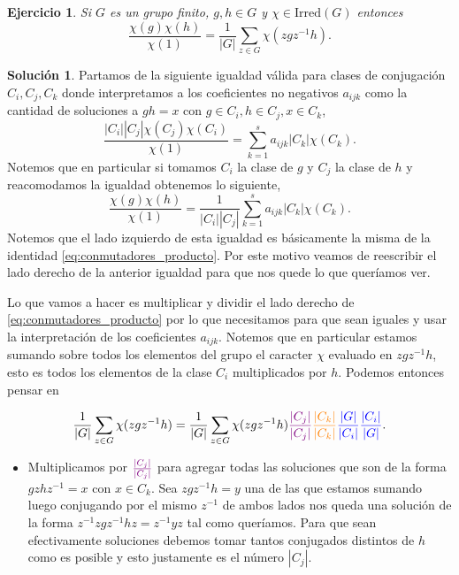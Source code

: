 \documentclass[11pt]{article}
\theoremstyle{plain}
\newtheorem*{ej}{Ejercicio}
\theoremstyle{definition}
\newtheorem*{sol}{Solución}
\theoremstyle{remark}
\begin{document}
	

\begin{tcolorbox}[colback=teal!25!white,colframe=teal!75!black]
	\begin{ej}
		Si $G$ es un grupo finito, $g,h \in G$ y $\chi \in \text{Irred}(G)$ entonces
		\begin{equation}
		\label{eq:conmutadores_producto}
		\dfrac{\chi(g) \chi(h)}{\chi (1)} = \dfrac{1}{|G|} \sum_{z \in G} \chi(zgz^{-1}h).
		\end{equation}
		 
	\end{ej}	
\end{tcolorbox}
\medskip

\begin{sol}
	Partamos de la siguiente igualdad válida para clases de conjugación $C_i, C_j, C_k$ donde interpretamos a los coeficientes no negativos $a_{ijk}$ como la cantidad de soluciones a $gh=x$ con $g \in C_i, h \in C_j, x \in C_k$,
	\[ 
	\dfrac{|C_i||C_j|\chi(C_j)\chi(C_i)}{\chi(1)} = \sum_{k=1}^s a_{ijk} |C_k| \chi(C_k).
	\]
	Notemos que en particular si tomamos $C_i$ la clase de $g$ y $C_j$ la clase de $h$ y reacomodamos la igualdad obtenemos lo siguiente,
	\[ 
	\dfrac{\chi(g)\chi(h)}{\chi(1)} = \dfrac{1}{|C_i||C_j|} \sum_{k=1}^s a_{ijk} |C_k| \chi(C_k).
	\]
	Notemos que el lado izquierdo de esta igualdad es básicamente la misma de la identidad \ref{eq:conmutadores_producto}. Por este motivo veamos de reescribir el lado derecho de la anterior igualdad para que nos quede lo que queríamos ver. 
	
	Lo que vamos a hacer es multiplicar y dividir el lado derecho de \ref{eq:conmutadores_producto} por lo que necesitamos para que sean iguales y usar la interpretación de los coeficientes $a_{ijk}$. Notemos que en particular estamos sumando sobre todos los elementos del grupo el caracter $\chi$ evaluado en $zgz^{-1}h$, esto es todos los elementos de la clase $C_i$ multiplicados por $h$. Podemos entonces pensar en 
	
	\begin{equation*}
	\dfrac{1}{|G|} \sum_{z \in G} \chi(zgz^{-1}h) = \dfrac{1}{|G|} \sum_{z \in G} \chi(zgz^{-1}h)   \textcolor{violet}{ \dfrac{|C_j|}{|C_j|}}  \textcolor{orange}{\dfrac{|C_k|}{|C_k|}}   \textcolor{blue}{\dfrac{|G|}{|C_i|} \dfrac{|C_i|}{|G|}}.
	\end{equation*}
	

	\begin{itemize}
		\item Multiplicamos por $\textcolor{violet}{ \frac{|C_j|}{|C_j|}}$ para agregar todas las soluciones que son de la forma $gzhz^{-1} = x$ con $x \in C_k$. Sea $zgz^{-1}h = y$ una de las que estamos sumando luego conjugando por el mismo $z^{-1}$ de ambos lados nos queda una solución de la forma $z^{-1}zgz^{-1}hz = z^{-1}yz$ tal como queríamos. Para que sean efectivamente soluciones debemos tomar tantos conjugados distintos de $h$ como es posible y esto justamente es el número $|C_j|$.
		

\end{itemize}
\end{sol}
\end{document}
